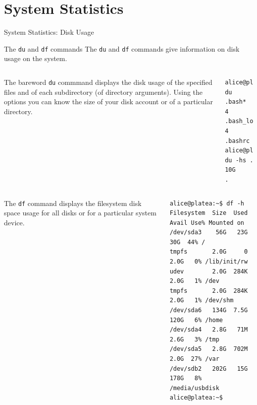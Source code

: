 \section{System Statistics}
\begin{frame}[t,fragile]{System Statistics: Disk Usage}


  \begin{block}{The \alert{\texttt{du}} and \alert{\texttt{df}} commands}
    {\footnotesize
The \alert{\texttt{du}} and \alert{\texttt{df}} commands give information on disk usage on the system.    }

  {\scriptsize

  \begin{columns}
       The bareword \alert{\texttt{du}} commmand displays the
  disk usage of the specified files and
of each subdirectory (of directory arguments). Using the options
  you can know the size of your disk account or of a particular directory.
        \hspace{-3cm}
        \begin{lstlisting}
alice@platea:~$ du .bash*
4	.bash_logout
4	.bashrc
alice@platea:~$ du -hs .
10G     .
        \end{lstlisting}
    \end{columns}
  \begin{columns}
      The \alert{\texttt{df}} command displays the
filesystem disk space  usage for all disks or for a particular system device.
        \hspace{-3cm}
        {\tiny
        \begin{lstlisting}
alice@platea:~$ df -h
Filesystem  Size  Used Avail Use% Mounted on
/dev/sda3    56G   23G   30G  44% /
tmpfs       2.0G     0  2.0G   0% /lib/init/rw
udev        2.0G  284K  2.0G   1% /dev
tmpfs       2.0G  284K  2.0G   1% /dev/shm
/dev/sda6   134G  7.5G  120G   6% /home
/dev/sda4   2.8G   71M  2.6G   3% /tmp
/dev/sda5   2.8G  702M  2.0G  27% /var
/dev/sdb2   202G   15G  178G   8% /media/usbdisk
alice@platea:~$ 
        \end{lstlisting}
      }
    \end{columns}
  }

  \end{block}
  
\end{frame}
